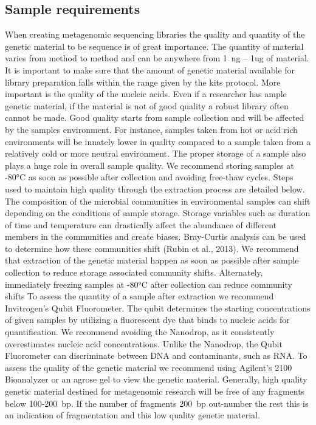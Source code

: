 \documentclass[graybox]{svmult}
\begin{document}
\subsection{Sample requirements }
\label{subsec:4}
%
When creating metagenomic sequencing libraries the quality and quantity of the genetic material to be sequence is of great importance. The quantity of material varies from method to method and can be anywhere from 1~ng – 1ug of material. It is important to make sure that the amount of genetic material available for library preparation falls within the range given by the kits protocol.
%
More important is the quality of the nucleic acids. Even if a researcher has ample genetic material, if the material is not of good quality a robust library often cannot be made. Good quality starts from sample collection and will be affected by the samples environment. For instance, samples taken from hot or acid rich environments will be innately lower in quality compared to a sample taken from a relatively cold or more neutral environment.
%
The proper storage of a sample also plays a huge role in overall sample quality. We recommend storing samples at -80°C as soon as possible after collection and avoiding free-thaw cycles. Steps used to maintain high quality through the extraction process are detailed below.
%
The composition of the microbial communities in environmental samples can shift depending on the conditions of sample storage. Storage variables such as duration of time and temperature can drastically affect the abundance of different members in the communities and create biases. Bray-Curtis analysis can be used to determine how these communities shift (Rubin et al., 2013). We recommend that extraction of the genetic material happen as soon as possible after sample collection to reduce storage associated community shifts. Alternately, immediately freezing samples at    -80°C after collection can reduce community shifts
%
To assess the quantity of a sample after extraction we recommend Invitrogen’s Qubit Fluorometer. The qubit determines the starting concentrations of given samples by utilizing a fluorescent dye that binds to nucleic acids for quantification. We recommend avoiding the Nanodrop, as it consistently overestimates nucleic acid concentrations. Unlike the Nanodrop, the Qubit Fluorometer can discriminate between DNA and contaminants, such as RNA.
%
To assess the quality of the genetic material we recommend using Agilent’s 2100 Bioanalyzer or an agrose gel to view the genetic material. Generally, high quality genetic material destined for metagenomic research will be free of any fragments below 100-200~bp.  If the number of fragments 200~bp out-number the rest this is an indication of fragmentation and this low quality genetic material.
\end{document}
